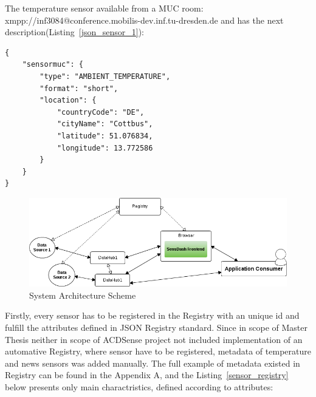 The temperature sensor available from a MUC room: xmpp://inf3084@conference.mobilis-dev.inf.tu-dresden.de and has the next description(Listing~\ref{json_sensor_1}):
	\begin{lstlisting}[label=json_sensor_1,caption=JSON Description Format]
{
    "sensormuc": {
        "type": "AMBIENT_TEMPERATURE",
        "format": "short",
        "location": {
            "countryCode": "DE",
            "cityName": "Cottbus",
            "latitude": 51.076834,
            "longitude": 13.772586
        }
    }
}
	\end{lstlisting}
    \begin{figure}[H]
    \centering
    \includegraphics[scale=0.6]{images/UseCaseScheme1.png}   
    \caption[Use Case System Architecture Scheme]{System Architecture Scheme} 
    \label{img:system_arch}                        
    \end{figure}
Firstly, every sensor has to be registered in the Registry with an unique id and fulfill the attributes defined in JSON Registry standard. Since in scope of Master Thesis neither in scope of ACDSense project not included implementation of an automative Registry, where sensor have to be registered, metadata of temperature and news sensors was added manually. The full example of metadata existed in Registry can be found in the Appendix A, and the Listing~\ref{sensor_registry} below presents only main charactristics, defined according to attributes:
